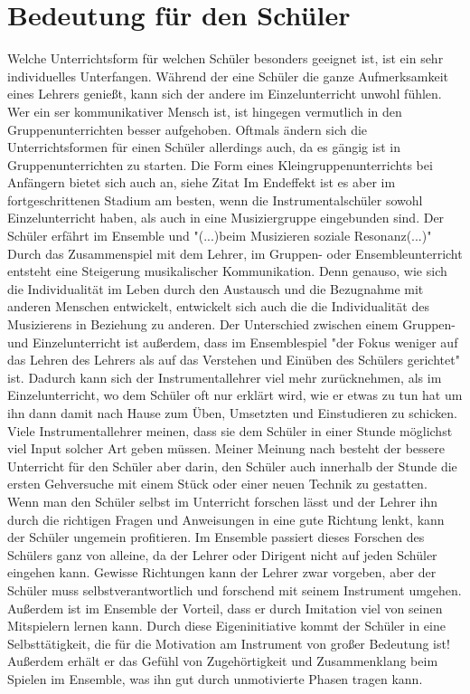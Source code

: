 \section{Bedeutung für den Schüler}
Welche Unterrichtsform für welchen Schüler besonders geeignet ist, ist ein sehr
individuelles Unterfangen. Während der eine Schüler die ganze Aufmerksamkeit
eines Lehrers genießt, kann sich der andere im Einzelunterricht unwohl fühlen.
Wer ein ser kommunikativer Mensch ist, ist hingegen vermutlich in den
Gruppenunterrichten besser aufgehoben. Oftmals ändern sich die Unterrichtsformen
für einen Schüler allerdings auch, da es gängig ist in Gruppenunterrichten zu
starten. Die Form eines Kleingruppenunterrichts bei Anfängern bietet sich auch
an, siehe Zitat \autocite[220]{busch:grundwissen_instrumentalpaedagogik} Im
Endeffekt ist es aber im fortgeschrittenen Stadium am besten, wenn die
Instrumentalschüler sowohl Einzelunterricht haben, als auch in eine
Musiziergruppe eingebunden sind. Der Schüler erfährt im Ensemble und "(...)beim
Musizieren soziale Resonanz(...)" \autocite[28]{mitzscherlich:musikpsychologie}
Durch das Zusammenspiel mit dem Lehrer, im Gruppen- oder Ensembleunterricht
entsteht eine Steigerung musikalischer Kommunikation.
\autocite[99]{mitzscherlich:musikpsychologie} Denn genauso, wie sich die
Individualität im Leben durch den Austausch und die Bezugnahme mit anderen
Menschen entwickelt, entwickelt sich auch die die Individualität des Musizierens
in Beziehung zu anderen. Der Unterschied zwischen einem Gruppen- und
Einzelunterricht ist außerdem, dass im Ensemblespiel "der Fokus weniger auf das
Lehren des Lehrers als auf das Verstehen und Einüben des Schülers gerichtet"
ist. \autocite[31]{losert:die_kunst_zu_unterrichten} Dadurch kann sich der
Instrumentallehrer viel mehr zurücknehmen, als im Einzelunterricht, wo dem
Schüler oft nur erklärt wird, wie er etwas zu tun hat um ihn dann damit nach
Hause zum Üben, Umsetzten und Einstudieren zu schicken. Viele Instrumentallehrer
meinen, dass sie dem Schüler in einer Stunde möglichst viel Input solcher Art
geben müssen. Meiner Meinung nach besteht der bessere Unterricht für den Schüler
aber darin, den Schüler auch innerhalb der Stunde die ersten Gehversuche mit
einem Stück oder einer neuen Technik zu gestatten. Wenn man den Schüler selbst
im Unterricht forschen lässt und der Lehrer ihn durch die richtigen Fragen und
Anweisungen in eine gute Richtung lenkt, kann der Schüler ungemein profitieren.
Im Ensemble passiert dieses Forschen des Schülers ganz von alleine, da der
Lehrer oder Dirigent nicht auf jeden Schüler eingehen kann. Gewisse Richtungen
kann der Lehrer zwar vorgeben, aber der Schüler muss selbstverantwortlich und
forschend mit seinem Instrument umgehen. Außerdem ist im Ensemble der Vorteil,
dass er durch Imitation viel von seinen Mitspielern lernen kann. Durch diese
Eigeninitiative kommt der Schüler in eine Selbsttätigkeit, die für die
Motivation am Instrument von großer Bedeutung ist! Außerdem erhält er das Gefühl
von Zugehörtigkeit und Zusammenklang beim Spielen im Ensemble, was ihn gut durch
unmotivierte Phasen tragen kann.

